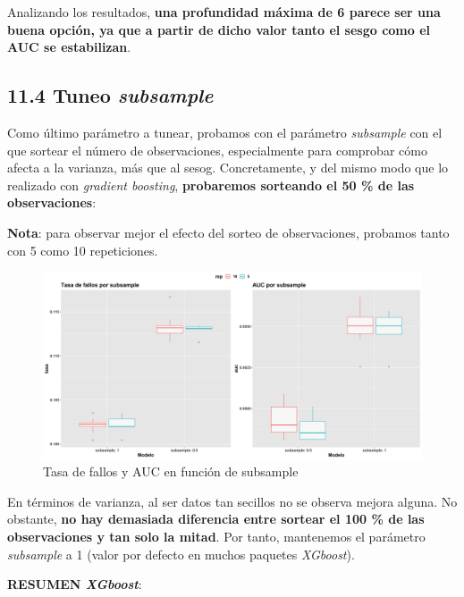 \documentclass[
]{article}
\begin{document}
Analizando los resultados, \textbf{una profundidad máxima de 6 parece
ser una buena opción, ya que a partir de dicho valor tanto el sesgo como
el AUC se estabilizan}.

\hypertarget{tuneo-subsample}{%
\subsection{\texorpdfstring{11.4 Tuneo
\emph{subsample}}{11.4 Tuneo subsample}}\label{tuneo-subsample}}

Como último parámetro a tunear, probamos con el parámetro
\emph{subsample} con el que sortear el número de observaciones,
especialmente para comprobar cómo afecta a la varianza, más que al
sesog. Concretamente, y del mismo modo que lo realizado con
\emph{gradient boosting}, \textbf{probaremos sorteando el 50 \% de las
observaciones}:

\textbf{Nota}: para observar mejor el efecto del sorteo de
observaciones, probamos tanto con 5 como 10 repeticiones.

\begin{figure}[h!]

{\centering \includegraphics[width=0.99\linewidth,height=0.99\textheight,]{./charts/xgboost/subsample} 

}

\caption{Tasa de fallos y AUC en función de subsample}\label{fig:unnamed-chunk-135}
\end{figure}

En términos de varianza, al ser datos tan secillos no se observa mejora
alguna. No obstante, \textbf{no hay demasiada diferencia entre sortear
el 100 \% de las observaciones y tan solo la mitad}. Por tanto,
mantenemos el parámetro \emph{subsample} a 1 (valor por defecto en
muchos paquetes \emph{XGboost}).

\textbf{RESUMEN \emph{XGboost}}:
\end{document}
